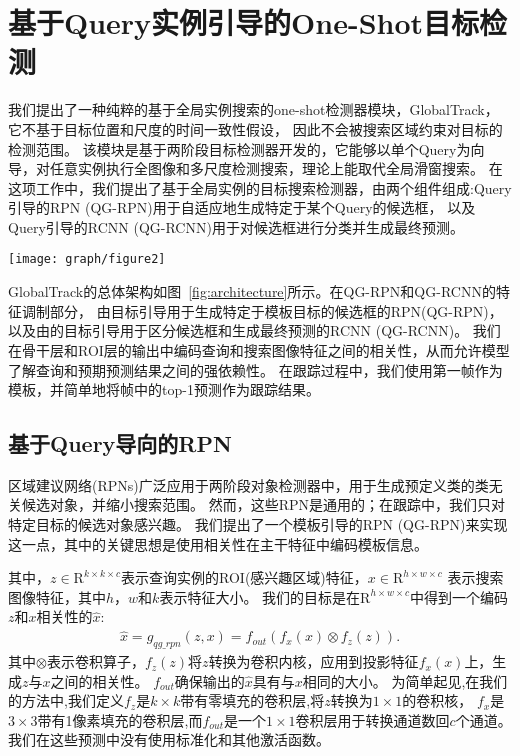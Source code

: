 \documentclass[promaster]{thesis-uestc}
\begin{document}
\section{基于Query实例引导的One-Shot目标检测}
我们提出了一种纯粹的基于全局实例搜索的one-shot检测器模块，GlobalTrack\cite{huang2020globaltrack}，它不基于目标位置和尺度的时间一致性假设，
因此不会被搜索区域约束对目标的检测范围。
该模块是基于两阶段目标检测器开发的，它能够以单个Query为向导，对任意实例执行全图像和多尺度检测搜索，理论上能取代全局滑窗搜索。
在这项工作中，我们提出了基于全局实例的目标搜索检测器，由两个组件组成:Query引导的RPN (QG-RPN)用于自适应地生成特定于某个Query的候选框，
以及Query引导的RCNN (QG-RCNN)用于对候选框进行分类并生成最终预测。
\begin{figure*}[t]
    \centering
    \texttt{[image: graph/figure2]}
    \caption{GlobalTrack的整体架构。}
    \label{fig:architecture}
\end{figure*}

GlobalTrack的总体架构如图~\ref{fig:architecture}所示。在QG-RPN和QG-RCNN的特征调制部分，
由目标引导用于生成特定于模板目标的候选框的RPN(QG-RPN)，以及由的目标引导用于区分候选框和生成最终预测的RCNN (QG-RCNN)。
我们在骨干层和ROI层的输出中编码查询和搜索图像特征之间的相关性，从而允许模型了解查询和预期预测结果之间的强依赖性。
在跟踪过程中，我们使用第一帧作为模板，并简单地将帧中的top-1预测作为跟踪结果。

\subsection{基于Query导向的RPN}
区域建议网络(RPNs)广泛应用于两阶段对象检测器中，用于生成预定义类的类无关候选对象，并缩小搜索范围。
然而，这些RPN是通用的；在跟踪中，我们只对特定目标的候选对象感兴趣。
我们提出了一个模板引导的RPN (QG-RPN)来实现这一点，其中的关键思想是使用相关性在主干特征中编码模板信息。

其中，$z \in \mathrm{R}^{k\times k\times c}$表示查询实例的ROI(感兴趣区域)特征，$x\in \mathrm{R}^{h\times w\times c}$
表示搜索图像特征，其中$h$，$w$和$k$表示特征大小。
我们的目标是在$\mathrm{R}^{h\times w\times c}$中得到一个编码$z$和$x$相关性的$ \hat{x} $:
%
\begin{eqnarray}\label{eq:rpn_modulation}
    \hat{x} = g_{qg\_rpn}(z, x) = f_{out} (f_x(x) \otimes f_z(z)).
\end{eqnarray}
%
其中$\otimes$表示卷积算子，$f_z(z)$将$z$转换为卷积内核，应用到投影特征$f_x(x)$上，生成$z$与$x$之间的相关性。
$f_{out}$确保输出的$\hat{x}$具有与$x$相同的大小。
%
为简单起见,在我们的方法中,我们定义$f_z$是$ k\times k$带有零填充的卷积层,将$z$转换为$1 \times 1$的卷积核，
$f_x$是$3\times3$带有1像素填充的卷积层,而$f_{out}$是一个$1 \times 1$卷积层用于转换通道数回$c$个通道。
我们在这些预测中没有使用标准化和其他激活函数。
\end{document}
